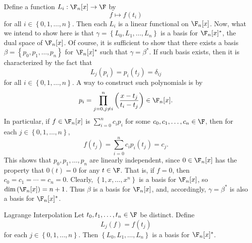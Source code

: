 \documentclass[linearalgebra]{subfiles}
\begin{document}
    \noindent Define a function $L_i:\F_n[x]\to\F$ by
    \begin{equation*}
        f\mapsto f\left( t_i \right) 
    \end{equation*}
    for all $i\in\left\lbrace 0,1,\ldots,n \right\rbrace$. Then each $L_i$ is a linear functional on $\F_n[x]$. Now, what we intend to show here is that $\gamma = \left\lbrace L_0,L_1,\ldots,L_n \right\rbrace$ is a basis for $\F_n[x]^{*}$, the dual space of $\F_n[x]$. Of course, it is sufficient to show that there exists a basis $\beta = \left\lbrace p_0,p_1,\ldots,p_n \right\rbrace$ for $\F_n[x]^{*}$ such that $\gamma = \beta^{*}$. If such basis exists, then it is characterized by the fact that
    \begin{equation*}
        L_j\left( p_i \right) = p_i\left( t_j \right) = \delta_{ij}
    \end{equation*}
    for all $i\in\left\lbrace 0,1,\ldots,n \right\rbrace$. A way to construct such polynomials is by
    \begin{equation*}
        p_i = \prod^{n}_{j=0,j\neq i} \left( \frac{x-t_j}{t_i-t_j} \right) \in\F_n[x].
    \end{equation*}
    In particular, if $f\in\F_n[x]$ is $\sum^{n}_{i=0} c_ip_i$ for some $c_0,c_1,\ldots,c_n\in\F$, then for each $j\in\left\lbrace 0,1,\ldots,n \right\rbrace$,
    \begin{equation*}
        f\left( t_j \right) = \sum^{n}_{i=0} c_ip_i\left( t_j \right) = c_j.
    \end{equation*}
    This shows that $p_0,p_1,\ldots,p_n$ are linearly independent, since $0\in\F_n[x]$ has the property that $0(t)=0$ for any $t\in\F$. That is, if $f=0$, then $c_0=c_1=\cdots=c_n=0$. Clearly, $\left\lbrace 1,x,\ldots,x^n \right\rbrace$ is a basis for $\F_n[x]$, so $\dim\left( \F_n[x] \right) = n+1$. Thus $\beta$ is a basis for $\F_n[x]$, and, accordingly, $\gamma=\beta^{*}$ is also a basis for $\F_n[x]^{*}$.

    \begin{theorem}{Lagrange Interpolation}
        Let $t_0,t_1,\ldots,t_n\in\F$ be distinct. Define
        \begin{equation*}
            L_j(f) = f(t_j)
        \end{equation*}
        for each $j\in \left\lbrace 0, 1, \ldots, n \right\rbrace$. Then $\left\lbrace L_0, L_1, \ldots, L_n \right\rbrace$ is a basis for $\F_n[x]^*$.
    \end{theorem}
\end{document}
